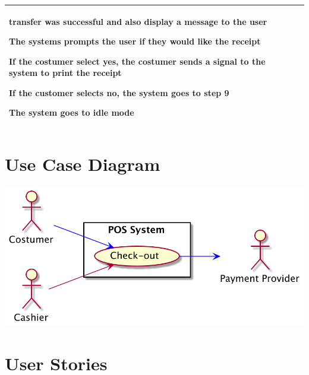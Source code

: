 \documentclass[12pt]{article}
\newenvironment{packed_enum}{
\begin{enumerate}[leftmargin=15pt, itemsep=0pt, parsep=0pt, font=\small]
  \setlength{\itemsep}{0pt}
  \setlength{\parskip}{0pt}
  \setlength{\parsep}{0pt}
}{\end{enumerate}}
\newenvironment{packed_enum_alpha}{
\begin{enumerate}[leftmargin=15pt, label=\alph*., font=\small]
  \setlength{\itemsep}{0pt}
  \setlength{\parskip}{0pt}
  \setlength{\parsep}{0pt}
}{\end{enumerate}}
\begin{document}
\begin{longtable}{| p{} | p{} |}
\begin{packed_enum}
\begin{footnotesize}
\begin{packed_enum_alpha}
\begin{packed_enum}
                    transfer was successful and also display a message 
                    to the user
                \end{packed_enum}
            \end{packed_enum_alpha}
            \item The systems prompts the user if they would like the receipt
            \begin{packed_enum_alpha}
                \item If the costumer select yes, the costumer sends a signal 
                to the system to print the receipt
                \item If the customer selects no, the system goes to step 9
            \end{packed_enum_alpha}
            \item The system goes to idle mode
        \end{footnotesize}
    \end{packed_enum}    \\ 
     \hline
    \end{longtable}
\pagebreak

\section{Use Case Diagram}
\begin{center}
    \includegraphics[scale=0.53]{diagram.png}
\end{center}
\pagebreak

\section{User Stories}
\end{document}
